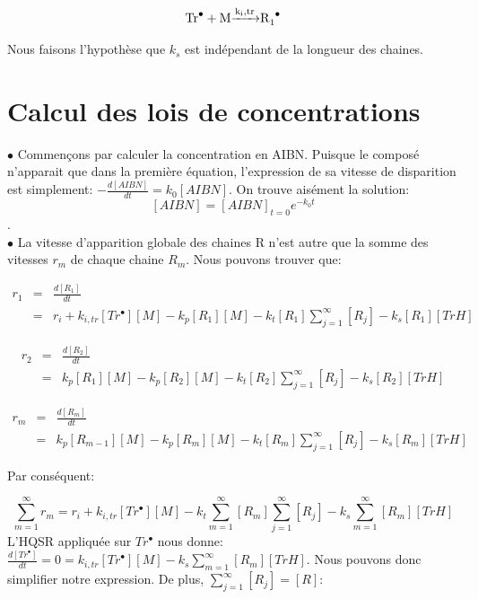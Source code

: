 \documentclass[a4paper,oneside,12pt]{article}
\begin{document}
\begin{equation}
\ce{Tr^{\bullet} + M \xrightarrow{k_i,tr} R_{1}^\bullet}
\end{equation}

Nous faisons l'hypothèse que $k_s$ est indépendant de la longueur des chaines.

\section{Calcul des lois de concentrations}
$\bullet$ Commençons par calculer la concentration en AIBN. Puisque le composé n'apparait que dans la première équation, l'expression de sa vitesse de disparition est simplement: $-\frac{d[AIBN]}{dt}=k_{0}[AIBN]$. On trouve aisément la solution: $$[AIBN]=[AIBN]_{t=0}e^{-k_{0}t} $$.\\

$\bullet$ La vitesse d'apparition globale des chaines R n'est autre que la somme des vitesses $r_{m}$ de chaque chaine $R_{m}$. Nous pouvons trouver que:

\begin{eqnarray*}
r_{1} &=& \frac{d[R_{1}]}{dt}\\
      &=& r_{i}+k_{i,tr}[Tr^{\bullet}][M]-k_p[R_{1}][M]-k_{t}[R_1]\sum\limits_{j=1}^\infty[R_j]-k_{s}[R_{1}][TrH]
\end{eqnarray*}

\begin{eqnarray*}
r_{2} &=& \frac{d[R_{2}]}{dt}\\
	&=& k_p[R_{1}][M]-k_p[R_{2}][M]-k_{t}[R_2]\sum\limits_{j=1}^\infty[R_j]-k_{s}[R_{2}][TrH]
\end{eqnarray*}

\begin{eqnarray*}
r_{m} &=& \frac{d[R_{m}]}{dt}\\
      &=& k_p[R_{m-1}][M]-k_p[R_{m}][M]-k_{t}[R_m]\sum\limits_{j=1}^\infty[R_j]-k_{s}[R_{m}][TrH]
\end{eqnarray*}

Par conséquent:

\begin{equation}
\sum\limits_{m=1}^\infty r_{m}=r_i+ k_{i,tr}[Tr^{\bullet}][M] -k_{t}\sum\limits_{m=1}^\infty [R_m] \sum\limits_{j=1}^\infty[R_j]-k_{s}\sum\limits_{m=1}^\infty[R_{m}][TrH]
\end{equation}
L'HQSR appliquée sur $Tr^{\bullet}$ nous donne: $\frac{d[Tr^{\bullet}]}{dt}=0=k_{i,tr}[Tr^{\bullet}][M]-k_{s}\sum\limits_{m=1}^\infty[R_{m}][TrH]$. Nous pouvons donc simplifier notre expression. De plus, $\sum\limits_{j=1}^\infty[R_j] = [R]$:
\end{document}
